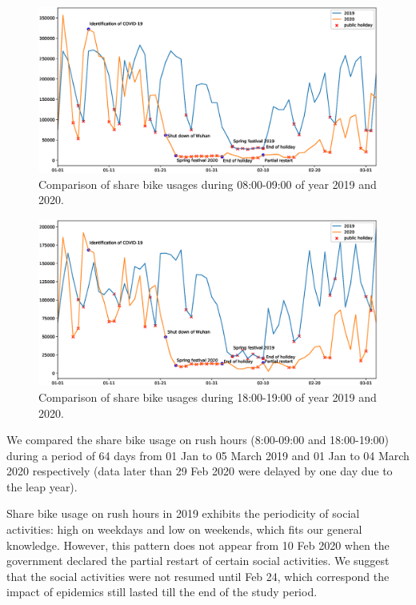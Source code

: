 \documentclass[preprints,ijgi,submit,moreauthors]{Definitions/mdpi}
\begin{document}
\begin{figure}[H]
    \centering
    \includegraphics[width=\textwidth]{hour_8.eps}
    \caption{Comparison of share bike usages during 08:00-09:00 of year 2019 and 2020.}
    \label{fig:hour_comparison_8}
\end{figure}

\begin{figure}[H]
    \centering
    \includegraphics[width=\textwidth]{hour_18.eps}
    \caption{Comparison of share bike usages during 18:00-19:00 of year 2019 and 2020.}
    \label{fig:hour_comparison_18}
\end{figure}

We compared the share bike usage on rush hours (8:00-09:00 and 18:00-19:00) during a period of 64 days from 01 Jan to 05 March 2019 and 01 Jan to 04 March 2020 respectively (data later than 29 Feb 2020 were delayed by one day due to the leap year).

Share bike usage on rush hours in 2019 exhibits the periodicity of social activities: high on weekdays and low on weekends, which fits our general knowledge.
However, this pattern does not appear from 10 Feb 2020 when the government declared the partial restart of certain social activities.
We suggest that the social activities were not resumed until Feb 24, which correspond the impact of epidemics still lasted till the end of the study period.
\end{document}
